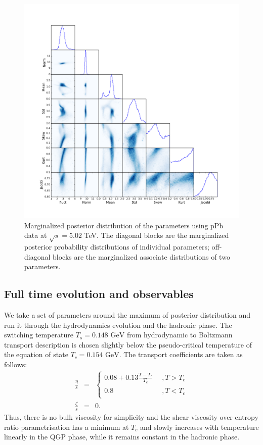 \documentclass[aps,prl,twocolumn,groupedaddress]{revtex4-1}
\begin{document}
	\begin{figure}
	\begin{center}
	\includegraphics[width=\columnwidth]{pics/corner-pPb.png}
	\caption{Marginalized posterior distribution of the parameters using pPb data at $\sqrt{s} = 5.02$ TeV. The diagonal blocks are the marginalized posterior probability distributions of individual parameters; off-diagonal blocks are the marginalized associate distributions of two parameters.}\label{corner-pPb}
	\end{center}
	\end{figure}	
	
	\subsection{Full time evolution and observables}
	We take a set of parameters around the maximum of posterior distribution and run it through the hydrodynamics evolution and the hadronic phase. 
	The switching temperature $T_s = 0.148 \textrm{ GeV}$ from hydrodynamic to Boltzmann transport description is chosen slightly below the pseudo-critical temperature of the equation of state $T_c = 0.154 \textrm{ GeV}$. The transport coefficients are taken as follows:
	\begin{eqnarray}
		\frac{\eta}{s}  & = & 
		\left\{ \begin{array}{l}
		0.08 + 0.13 \frac{T - T_c}{T_c} \phantom{0.8} , T > T_c \\
		0.8 \phantom{0.12 + 0.13 \frac{T - T_c}{T_c}}, T < T_c
		\end{array}
		\right.	\\
		\frac{\zeta}{s} &=&  0.
	\end{eqnarray}
	Thus, there is no bulk viscosity for simplicity and the shear viscosity over entropy ratio parametrisation has a minimum at $T_c$ and slowly increases with temperature linearly in the QGP phase, while it remains constant in the hadronic phase.
		
\end{document}
